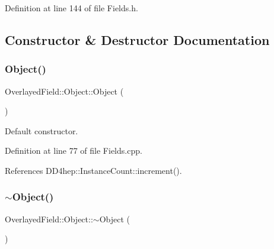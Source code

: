 Definition at line 144 of file Fields.\+h.



\subsection{Constructor \& Destructor Documentation}
\hypertarget{class_d_d4hep_1_1_geometry_1_1_overlayed_field_1_1_object_a5c62fce5f0a4f429ff6560940cbc94ab}{}\label{class_d_d4hep_1_1_geometry_1_1_overlayed_field_1_1_object_a5c62fce5f0a4f429ff6560940cbc94ab} 
\subsubsection{\texorpdfstring{Object()}{Object()}}
{\footnotesize\ttfamily Overlayed\+Field\+::\+Object\+::\+Object (\begin{DoxyParamCaption}{ }\end{DoxyParamCaption})}



Default constructor. 



Definition at line 77 of file Fields.\+cpp.



References D\+D4hep\+::\+Instance\+Count\+::increment().

\hypertarget{class_d_d4hep_1_1_geometry_1_1_overlayed_field_1_1_object_ad8d5178e3718579c79f92a4bb740e57d}{}\label{class_d_d4hep_1_1_geometry_1_1_overlayed_field_1_1_object_ad8d5178e3718579c79f92a4bb740e57d} 
\subsubsection{\texorpdfstring{$\sim$\+Object()}{~Object()}}
{\footnotesize\ttfamily Overlayed\+Field\+::\+Object\+::$\sim$\+Object (\begin{DoxyParamCaption}{ }\end{DoxyParamCaption})\hspace{0.3cm}{\ttfamily [virtual]}}



